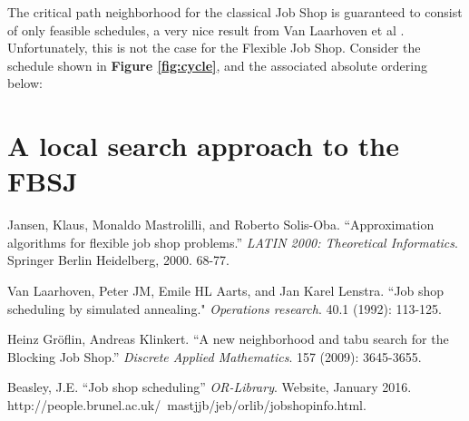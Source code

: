 \documentclass[a4paper,10pt]{article}
\begin{document}
The critical path neighborhood for the classical Job Shop is guaranteed to consist of only feasible schedules, a very nice result from Van Laarhoven et al \cite{simulatedannealingjsp}. Unfortunately, this is not the case for the Flexible Job Shop. Consider the schedule shown in \textbf{Figure \ref{fig:cycle}}, and the associated absolute ordering below:

\section{A local search approach to the FBSJ}

\begin{thebibliography}{9}

	Jansen, Klaus, Monaldo Mastrolilli, and Roberto Solis-Oba.
	``Approximation algorithms for flexible job shop problems.''
	\textit{LATIN 2000: Theoretical Informatics}.
	Springer Berlin Heidelberg, 2000. 68-77.

	Van Laarhoven, Peter JM, Emile HL Aarts, and Jan Karel Lenstra.
	``Job shop scheduling by simulated annealing."
	\textit{Operations research}.
	40.1 (1992): 113-125.

	Heinz Gr{\"o}flin, Andreas Klinkert.
	``A new neighborhood and tabu search for the Blocking Job Shop.''
	\textit{Discrete Applied Mathematics}. 157 (2009): 3645-3655.

	Beasley, J.E. 
	``Job shop scheduling''
	\textit{OR-Library}.
	Website, January 2016. http://people.brunel.ac.uk/~mastjjb/jeb/orlib/jobshopinfo.html.

\end{thebibliography}
\end{document}
